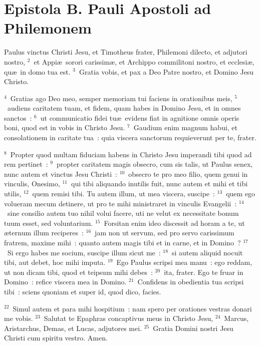 {\centering \section*{Epistola B. Pauli Apostoli ad Philemonem}}\thispagestyle{empty}

\noindent Paulus vinctus Christi Jesu, et Timotheus frater, Philemoni dilecto, et adjutori nostro,
${}^{2}$~et Appi\ae\ sorori carissim\ae , et Archippo commilitoni nostro, et ecclesi\ae , qu\ae\ in domo tua est.
${}^{3}$~Gratia vobis, et pax a Deo Patre nostro, et Domino Jesu Christo.


${}^{4}$~Gratias ago Deo meo, semper memoriam tui faciens in orationibus meis,
${}^{5}$~audiens caritatem tuam, et fidem, quam habes in Domino Jesu, et in omnes sanctos~:
${}^{6}$~ut communicatio fidei tu\ae\ evidens fiat in agnitione omnis operis boni, quod est in vobis in Christo Jesu.
${}^{7}$~Gaudium enim magnum habui, et consolationem in caritate tua~: quia viscera sanctorum requieverunt per te, frater.


${}^{8}$~Propter quod multam fiduciam habens in Christo Jesu imperandi tibi quod ad rem pertinet~:
${}^{9}$~propter caritatem magis obsecro, cum sis talis, ut Paulus senex, nunc autem et vinctus Jesu Christi~:
${}^{10}$~obsecro te pro meo filio, quem genui in vinculis, Onesimo,
${}^{11}$~qui tibi aliquando inutilis fuit, nunc autem et mihi et tibi utilis,
${}^{12}$~quem remisi tibi. Tu autem illum, ut mea viscera, suscipe~:
${}^{13}$~quem ego volueram mecum detinere, ut pro te mihi ministraret in vinculis Evangelii~:
${}^{14}$~sine consilio autem tuo nihil volui facere, uti ne velut ex necessitate bonum tuum esset, sed voluntarium.
${}^{15}$~Forsitan enim ideo discessit ad horam a te, ut \ae ternum illum reciperes~:
${}^{16}$~jam non ut servum, sed pro servo carissimum fratrem, maxime mihi~: quanto autem magis tibi et in carne, et in Domino~?
${}^{17}$~Si ergo habes me socium, suscipe illum sicut me~:
${}^{18}$~si autem aliquid nocuit tibi, aut debet, hoc mihi imputa.
${}^{19}$~Ego Paulus scripsi mea manu~: ego reddam, ut non dicam tibi, quod et teipsum mihi debes~:
${}^{20}$~ita, frater. Ego te fruar in Domino~: refice viscera mea in Domino.
${}^{21}$~Confidens in obedientia tua scripsi tibi~: sciens quoniam et super id, quod dico, facies.


${}^{22}$~Simul autem et para mihi hospitium~: nam spero per orationes vestras donari me vobis.
${}^{23}$~Salutat te Epaphras concaptivus meus in Christo Jesu,
${}^{24}$~Marcus, Aristarchus, Demas, et Lucas, adjutores mei.
${}^{25}$~Gratia Domini nostri Jesu Christi cum spiritu vestro. Amen.
